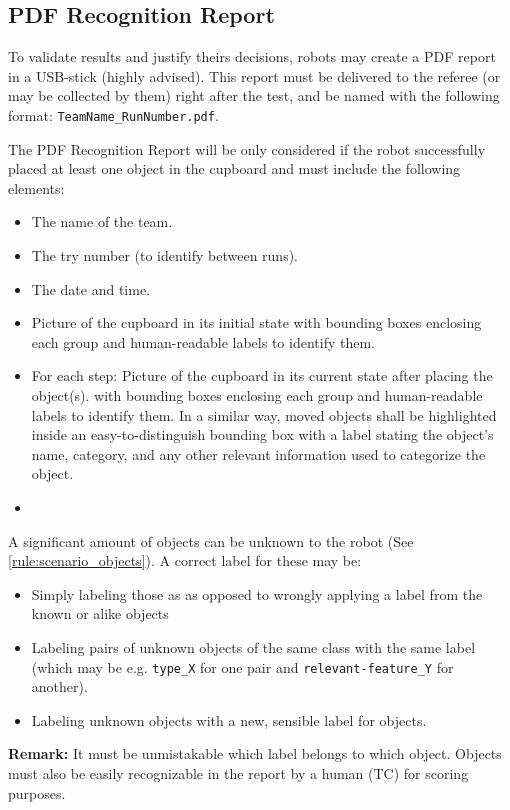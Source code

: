 \subsection{PDF Recognition Report}
To validate results and justify theirs decisions, robots may create a PDF report in a USB-stick (highly advised). This report must be delivered to the referee (or may be collected by them) right after the test, and be named with the following format: \texttt{TeamName\_RunNumber.pdf}.

The PDF Recognition Report will be only considered if the robot successfully placed at least one object in the cupboard and must include the following elements:
\begin{itemize}
	\item The name of the team.
	\item The try number (to identify between runs).
	\item The date and time.
	\item Picture of the cupboard in its initial state with bounding boxes enclosing each group and human-readable labels to identify them.
	\item For each step: Picture of the cupboard in its current state after placing the object(s). with bounding boxes enclosing each group and human-readable labels to identify them. In a similar way, moved objects shall be highlighted inside an easy-to-distinguish bounding box with a label stating the object's name, category, and any other relevant information used to categorize the object.
	\item
\end{itemize}

A significant amount of objects can be unknown to the robot (See \ref{rule:scenario_objects}). A correct label for these may be:
\begin{itemize}
	\item Simply labeling those as  as opposed to wrongly applying a label from the known or alike objects
	\item Labeling pairs of unknown objects of the same class with the same label (which may be e.g. \texttt{type\_X} for one pair and \texttt{relevant-feature\_Y} for another).
	\item Labeling unknown objects with a new, sensible label for objects.
\end{itemize}

\textbf{Remark:} It must be unmistakable which label belongs to which object. Objects must also be easily recognizable in the report by a human (TC) for scoring purposes.

